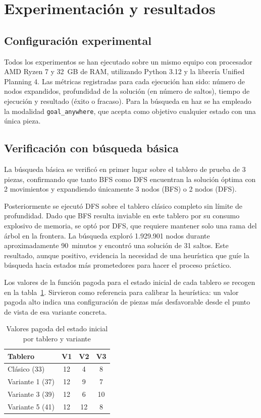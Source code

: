 \documentclass[conference,a4paper]{IEEEtran}
\begin{document}
\section{Experimentación y resultados}

\subsection{Configuración experimental}

Todos los experimentos se han ejecutado sobre un mismo equipo con procesador
AMD Ryzen 7 y 32~GB de RAM, utilizando Python 3.12 y la librería
Unified Planning 4. Las métricas registradas para cada ejecución han sido:
número de nodos expandidos, profundidad de la solución (en número de saltos),
tiempo de ejecución y resultado (éxito o fracaso). Para la búsqueda en haz se
ha empleado la modalidad \texttt{goal\_anywhere}, que acepta como objetivo
cualquier estado con una única pieza.

\subsection{Verificación con búsqueda básica}

La búsqueda básica se verificó en primer lugar sobre el tablero de prueba de
3 piezas, confirmando que tanto BFS como DFS encuentran la solución óptima
con 2 movimientos y expandiendo únicamente 3 nodos (BFS) o 2 nodos (DFS).

Posteriormente se ejecutó DFS sobre el tablero clásico completo sin límite de
profundidad. Dado que BFS resulta inviable en este tablero por su consumo
explosivo de memoria, se optó por DFS, que requiere mantener solo una rama
del árbol en la frontera. La búsqueda exploró 1.929.901 nodos durante
aproximadamente 90~minutos y encontró una solución de 31 saltos. Este
resultado, aunque positivo, evidencia la necesidad de una heurística que guíe
la búsqueda hacia estados más prometedores para hacer el proceso práctico.

Los valores de la función pagoda para el estado inicial de cada tablero se
recogen en la tabla~\ref{tab:pagoda}. Sirvieron como referencia para calibrar
la heurística: un valor pagoda alto indica una configuración de piezas más
desfavorable desde el punto de vista de esa variante concreta.

\begin{table}
  \caption{Valores pagoda del estado inicial por tablero y variante}
  \label{tab:pagoda}
  \centering
  \begin{tabular}{lccc}
    \toprule
    Tablero & V1 & V2 & V3 \\
    \midrule
    Clásico (33) & 12 & 4 & 8 \\
    Variante 1 (37) & 12 & 9 & 7 \\
    Variante 3 (39) & 12 & 6 & 10 \\
    Variante 5 (41) & 12 & 12 & 8 \\
    \bottomrule
  \end{tabular}
\end{table}
\end{document}
